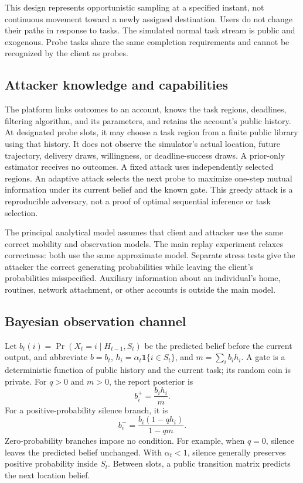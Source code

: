 \documentclass[review,12pt]{elsarticle}
\newcommand{\ind}{\mathbf{1}}
\begin{document}
This design represents opportunistic sampling at a specified instant, not continuous movement toward a newly assigned destination. Users do not change their paths in response to tasks. The simulated normal task stream is public and exogenous. Probe tasks share the same completion requirements and cannot be recognized by the client as probes.

\subsection{Attacker knowledge and capabilities}
The platform links outcomes to an account, knows the task regions, deadlines, filtering algorithm, and its parameters, and retains the account's public history. At designated probe slots, it may choose a task region from a finite public library using that history. It does not observe the simulator's actual location, future trajectory, delivery draws, willingness, or deadline-success draws. A prior-only estimator receives no outcomes. A fixed attack uses independently selected regions. An adaptive attack selects the next probe to maximize one-step mutual information under its current belief and the known gate. This greedy attack is a reproducible adversary, not a proof of optimal sequential inference or task selection.

The principal analytical model assumes that client and attacker use the same correct mobility and observation models. The main replay experiment relaxes correctness: both use the same approximate model. Separate stress tests give the attacker the correct generating probabilities while leaving the client's probabilities misspecified. Auxiliary information about an individual's home, routines, network attachment, or other accounts is outside the main model.

\subsection{Bayesian observation channel}
Let $b_t(i)=\Pr(X_t=i\mid H_{t-1},S_t)$ be the predicted belief before the current output, and abbreviate $b=b_t$, $h_i=\alpha_t\ind\{i\in S_t\}$, and $m=\sum_i b_i h_i$. A gate is a deterministic function of public history and the current task; its random coin is private. For $q>0$ and $m>0$, the report posterior is
\begin{equation}
 b_i^+=\frac{b_i h_i}{m}.
 \label{eq:positive}
\end{equation}
For a positive-probability silence branch, it is
\begin{equation}
 b_i^-=\frac{b_i(1-qh_i)}{1-qm}.
 \label{eq:silence}
\end{equation}
Zero-probability branches impose no condition. For example, when $q=0$, silence leaves the predicted belief unchanged. With $\alpha_t<1$, silence generally preserves positive probability inside $S_t$. Between slots, a public transition matrix predicts the next location belief.
\end{document}
